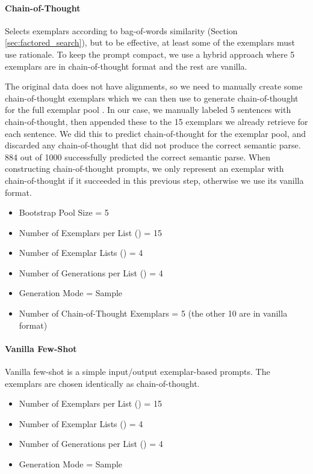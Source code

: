 \documentclass{article} \usepackage{iclr2022_conference,times}
\begin{document}
\paragraph{Chain-of-Thought}

Selects exemplars according to bag-of-words similarity (Section \ref{sec:factored_search}), but to be effective, at least some of the exemplars must use rationale. To keep the prompt compact, we use a hybrid approach where 5 exemplars are in chain-of-thought format and the rest are vanilla.

The original data does not have alignments, so we need to manually create some chain-of-thought exemplars which we can then use to generate chain-of-thought for the full exemplar pool \citep{zelikman2022star}. In our case, we manually labeled 5 sentences with chain-of-thought, then appended these to the 15 exemplars we already retrieve for each sentence. We did this to predict chain-of-thought for the exemplar pool, and discarded any chain-of-thought that did not produce the correct semantic parse. 884 out of 1000 successfully predicted the correct semantic parse. When constructing chain-of-thought prompts, we only represent an exemplar with chain-of-thought if it succeeded in this previous step, otherwise we use its vanilla format.

\begin{itemize}
    \item Bootstrap Pool Size = 5
    \item Number of Exemplars per List () = 15
    \item Number of Exemplar Lists () = 4
    \item Number of Generations per List () = 4
    \item Generation Mode = Sample
    \item Number of Chain-of-Thought Exemplars = 5 (the other 10 are in vanilla format)
\end{itemize}

\paragraph{Vanilla Few-Shot}

Vanilla few-shot is a simple input/output exemplar-based prompts. The exemplars are chosen identically as chain-of-thought.

\begin{itemize}
    \item Number of Exemplars per List () = 15
    \item Number of Exemplar Lists () = 4
    \item Number of Generations per List () = 4
    \item Generation Mode = Sample
\end{itemize}
\end{document}
